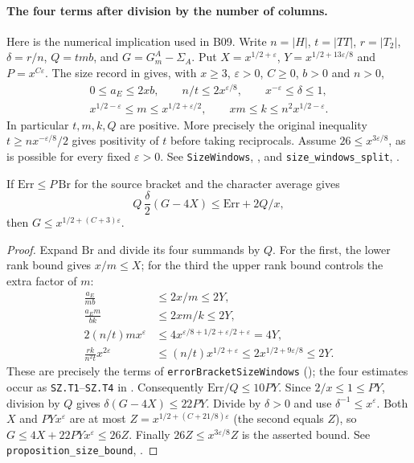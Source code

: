 \paragraph{The four terms after division by the number of columns.}
Here is the numerical implication used in B09. Write $n=|H|$, $t=|TT|$,
$r=|T_2|$, $\delta=r/n$, $Q=tmb$, and $G=G_m^A-\Sigma_A$. Put
$X=x^{1/2+\varepsilon}$, $Y=x^{1/2+13\varepsilon/8}$ and $P=x^{C\varepsilon}$.
The size record in  gives, with $x\ge3$, $\varepsilon>0$, $C\ge0$, $b>0$ and $n>0$,
\[
\begin{gathered}
0\le a_E\le2xb,\qquad n/t\le 2x^{\varepsilon/8},\qquad
x^{-\varepsilon}\le\delta\le1,\\
x^{1/2-\varepsilon}\le m\le x^{1/2+\varepsilon/2},\qquad
xm\le k\le n^2 x^{1/2-\varepsilon}.
\end{gathered}
\]
In particular $t,m,k,Q$ are positive. More precisely the original inequality
$t\ge n x^{-\varepsilon/8}/2$ gives positivity of $t$ before taking
reciprocals. Assume $26\le x^{3\varepsilon/8}$, as is possible for
every fixed $\varepsilon>0$.
See \nolinkurl{SizeWindows}, ,
and \nolinkurl{size_windows_split}, .

\begin{lemma}\label{r23:budget}
If $\mathrm{Err}\le P\,\mathrm{Br}$ for the source bracket and the
character average gives
\[
Q\,\frac{\delta}{2}(G-4X)\le\mathrm{Err}+2Q/x,
\]
then $G\le x^{1/2+(C+3)\varepsilon}$.
\end{lemma}
\begin{proof}
Expand $\mathrm{Br}$ and divide its four summands by $Q$.
For the first, the lower rank bound gives $x/m\le X$; for the
third the upper rank bound controls the extra factor of $m$:
\[
\begin{aligned}
\frac{a_E}{mb}&\le2x/m\le2Y,\\
\frac{a_E m}{bk}&\le2xm/k\le2Y,\\
2(n/t)m x^\varepsilon
 &\le4x^{\varepsilon/8+1/2+\varepsilon/2+\varepsilon}=4Y,\\
\frac{r k}{n^2t}x^{2\varepsilon}
 &\le(n/t)x^{1/2+\varepsilon}\le2x^{1/2+9\varepsilon/8}\le2Y .
\end{aligned}
\]
These are precisely the terms of \nolinkurl{errorBracketSizeWindows}
();
the four estimates occur as \nolinkurl{SZ.T1}--\nolinkurl{SZ.T4}
in .
Consequently $\mathrm{Err}/Q\le 10PY$. Since $2/x\le1\le PY$, division by
$Q$ gives $\delta(G-4X)\le22PY$. Divide by $\delta>0$ and use
$\delta^{-1}\le x^\varepsilon$. Both $X$ and $PYx^\varepsilon$ are at
most $Z=x^{1/2+(C+21/8)\varepsilon}$ (the second equals $Z$), so
$G\le4X+22PYx^\varepsilon\le26Z$. Finally $26Z\le x^{3\varepsilon/8}Z$
is the asserted bound. See \nolinkurl{proposition_size_bound},
.
\end{proof}
